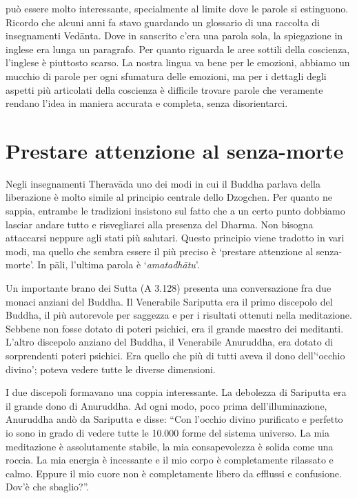 
 può essere molto interessante, specialmente al limite dove le parole si estinguono. Ricordo che alcuni anni fa stavo guardando un glossario di una raccolta di insegnamenti Vedānta. Dove in sanscrito c'era una parola sola, la spiegazione in inglese era lunga un paragrafo. Per quanto riguarda le aree sottili della coscienza, l'inglese è piuttosto scarso. La nostra lingua va bene per le emozioni, abbiamo un mucchio di parole per ogni sfumatura delle emozioni, ma per i dettagli degli aspetti più articolati della coscienza è difficile trovare parole che veramente rendano l'idea in maniera accurata e completa, senza disorientarci. 

\section*{Prestare attenzione al senza-morte}

Negli insegnamenti Theravāda uno dei modi in cui il Buddha parlava della liberazione è molto simile al principio centrale dello Dzogchen. Per quanto ne sappia, entrambe le tradizioni insistono sul fatto che a un certo punto dobbiamo lasciar andare tutto e risvegliarci alla presenza del Dharma. Non bisogna attaccarsi neppure agli stati più salutari. Questo principio viene tradotto in vari modi, ma quello che sembra essere il più preciso è `prestare attenzione al senza-morte'. In pāli, l'ultima parola è `\textit{amatadhātu}'.

Un importante brano dei Sutta (A 3.128) presenta una conversazione fra due monaci anziani del Buddha. Il Venerabile Sariputta era il primo discepolo del Buddha, il più autorevole per saggezza e per i risultati ottenuti nella meditazione. Sebbene non fosse dotato di poteri psichici, era il grande maestro dei meditanti. L'altro discepolo anziano del Buddha, il Venerabile Anuruddha, era dotato di sorprendenti poteri psichici. Era quello che più di tutti aveva il dono dell'`occhio divino'; poteva vedere tutte le diverse dimensioni.

I due discepoli formavano una coppia interessante. La debolezza di Sariputta era il grande dono di Anuruddha. Ad ogni modo, poco prima dell'illuminazione, Anuruddha andò da Sariputta e disse: ``Con l'occhio divino purificato e perfetto io sono in grado di vedere tutte le 10.000 forme del sistema universo. La mia meditazione è assolutamente stabile, la mia consapevolezza è solida come una roccia. La mia energia è incessante e il mio corpo è completamente rilassato e calmo. Eppure il mio cuore non è completamente libero da efflussi e confusione. Dov'è che sbaglio?''.

